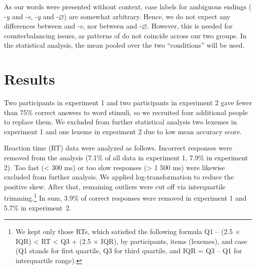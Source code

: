 \documentclass[output=paper, modfonts,newtxmath,hidelinks]{langscibook}
\begin{document}
As our words were presented without context, case labels for ambiguous endings ( -\textit{y} and -\textit{e},  -\textit{y} and -\textit{$\varnothing$}) are somewhat arbitrary. Hence, we do not expect any differences between   and  -\textit{e}, nor between   and  -\textit{$\varnothing$}. However, this is needed for counterbalancing issues, as patterns of  do not coincide across our two  groups. In the statistical analysis, the mean pooled over the two ``conditions'' will be used.

\section{Results}
Two participants in experiment 1 and two participants in experiment 2 gave fewer than 75\% correct answers to word stimuli, so we recruited four additional people to replace them. We excluded from further  statistical analysis two lexemes in experiment 1 and one lexeme in experiment 2 due to low mean accuracy score.

Reaction time (RT) data were analyzed as follows. Incorrect responses were removed from the analysis (7.1\% of all data in experiment 1, 7.9\% in experiment 2). Too fast (< 300 ms) or too slow responses (> 1 500 ms) were likewise excluded from further analysis. We applied log-transformation to reduce the positive skew. After that, remaining outliers were cut off via interquartile trimming.\footnote{We kept only those RTs, which satisfied the following formula Q1 – (2.5 × IQR) < RT < Q3 + (2.5 × IQR), by participants, items (lexemes),  and case (Q1 stands for first quartile, Q3 for third quartile, and IQR = Q3 – Q1 for interquartile range).} In sum, 3.9\% of correct responses were removed in experiment 1 and 5.7\% in experiment~2.
\end{document}
